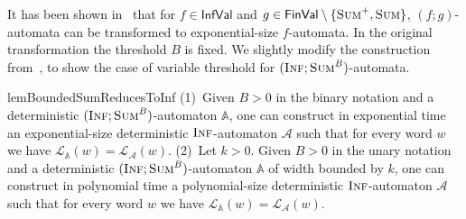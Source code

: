 \documentclass{lmcs}
\newcommand{\proofideas}{\smallskip\noindent{\emph{The key ideas.}}}
\newcommand{\nestedA}{\mathbb{A}}
\newcommand{\nonnestedA}{\mathcal{A}}
\newcommand{\valueL}[1]{\mathcal{L}_{{#1}}}
\newcommand{\fsum}{\textsc{Sum}}
\newcommand{\fBsum}[1]{\textsc{Sum}^{#1}}
\newcommand{\finf}{\textsc{Inf}}
\newcommand{\FinVal}{\mathsf{FinVal}}
\newcommand{\InfVal}{\mathsf{InfVal}}
\begin{document}
\proofideas{}
It has been shown in~\cite{nested} that for
$f \in \InfVal$ and $g \in \FinVal \setminus \{ \fsum^+, \fsum \}$,
$(f;g)$-automata can be transformed to exponential-size $f$-automata.
In the original transformation the threshold $B$ is fixed.
We slightly modify the construction from~\cite{nested}, to show the case of variable threshold for  $(\finf; \fBsum{B})$-automata.

\begin{restatable}{lem}{BoundedSumReducesToInf}\label{l:bsum-to-inf}
(1)~Given $B >0$ in the binary notation and a deterministic $(\finf; \fBsum{B})$-automaton $\nestedA$, one can construct
in exponential time an exponential-size deterministic $\finf$-automaton $\nonnestedA$ such that for every word $w$
we have $\valueL{\nestedA}(w) = \valueL{\nonnestedA}(w)$.
(2)~Let $k > 0$.
Given $B >0$ in the unary notation and a deterministic $(\finf; \fBsum{B})$-automaton $\nestedA$ of width bounded by $k$,
one can construct in polynomial time a polynomial-size deterministic $\finf$-automaton $\nonnestedA$ such that for every word $w$
we have $\valueL{\nestedA}(w) = \valueL{\nonnestedA}(w)$.
\end{restatable}
\end{document}
